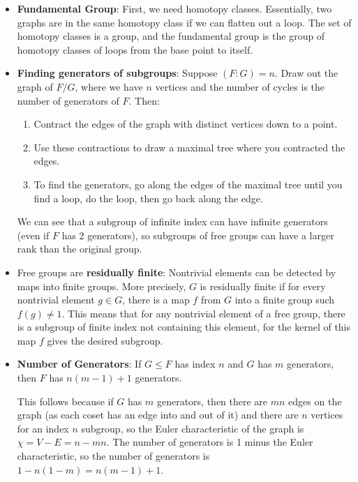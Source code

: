 \documentclass[11pt, oneside]{amsart}   	%
\theoremstyle{definition}
\begin{document}
\begin{itemize}
	\item \textbf{Fundamental Group}: First, we need homotopy classes. Essentially, two graphs are in the same homotopy class if we can flatten out 
	a loop. The set of homotopy classes is a group, and the fundamental group is the group of homotopy classes of loops from the base point to 
	itself. 
	
	\item \textbf{Finding generators of subgroups}: Suppose $(F : G) = n$. Draw out the graph of $F/G$, where we have $n$ vertices and the number 
	of cycles is the number of generators of $F$. Then:
		
		\begin{enumerate}
		
			\item Contract the edges of the graph with distinct vertices down to a point. 
			
			\item Use these contractions to draw a maximal tree where you contracted the edges. 
			
			\item To find the generators, go along the edges of the maximal tree until you find a loop, do the loop, then go back along the edge. 
		
		\end{enumerate}
	
	We can see that a subgroup of infinite index can have infinite generators (even if $F$ has 2 generators), so subgroups of free groups can have 
	a larger rank than the original group.
	
	\item Free groups are \textbf{residually finite}: Nontrivial elements can be detected by maps into finite groups. More precisely, $G$ is residually 
	finite if for every nontrivial element $g\in G$, there is a map $f$ from $G$ into a finite group such $f(g) \neq 1$. This means that for any nontrivial 
	element of a free group, there is a subgroup of finite index not containing this element, for the kernel of this map $f$ gives the desired subgroup.
	
	\item \textbf{Number of Generators}: If $G\leq F$ has index $n$ and $G$ has $m$ generators, then $F$ has $n(m - 1) + 1$ generators.
	
	This follows because if $G$ has $m$ generators, then there are $mn$ edges on the graph (as each coset has an edge into and out of it) and 
	there are $n$ vertices for an index $n$ subgroup, so the Euler characteristic of the graph is $\chi = V - E = n - mn$. The number of generators 
	is 1 minus the Euler characteristic, so the number of generators is $1 - n(1 - m) = n(m - 1) + 1$.

\end{itemize}
\end{document}
